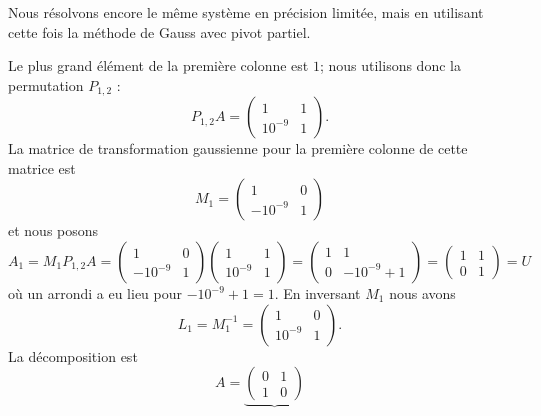 \begin{example}     \label{EXooNCRSooTfmPFr}
	Nous résolvons encore le même système en précision limitée, mais en utilisant cette fois la méthode de Gauss avec pivot partiel.

	Le plus grand élément de la première colonne est \( 1\); nous utilisons donc la permutation \( P_{1,2}\) :
	\begin{equation}
		P_{1,2}A=\begin{pmatrix}
			1       & 1 \\
			10^{-9} & 1
		\end{pmatrix}.
	\end{equation}
	La matrice de transformation gaussienne pour la première colonne de cette matrice est
	\begin{equation}
		M_1=\begin{pmatrix}
			1        & 0 \\
			-10^{-9} & 1
		\end{pmatrix}
	\end{equation}
	et nous posons
	\begin{equation}
		A_1=M_1P_{1,2}A=
		\begin{pmatrix}
			1        & 0 \\
			-10^{-9} & 1
		\end{pmatrix}
		\begin{pmatrix}
			1       & 1 \\
			10^{-9} & 1
		\end{pmatrix}
		=\begin{pmatrix}
			1 & 1          \\
			0 & -10^{-9}+1
		\end{pmatrix}=
		\begin{pmatrix}
			1 & 1 \\
			0 & 1
		\end{pmatrix}=U
	\end{equation}
	où un arrondi a eu lieu pour \( -10^{-9}+1=1\). En inversant \( M_1\) nous avons
	\begin{equation}
		L_1=M_1^{-1}=\begin{pmatrix}
			1       & 0 \\
			10^{-9} & 1
		\end{pmatrix}.
	\end{equation}
	La décomposition est
	\begin{equation}
		A=\underbrace{\begin{pmatrix}
				0 & 1 \\
				1 & 0

\end{pmatrix}}
\end{equation}
\end{example}
